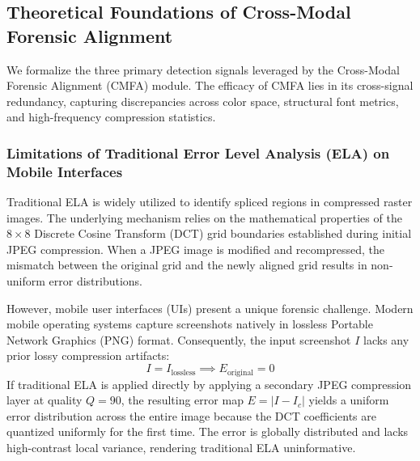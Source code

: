 \subsection{Theoretical Foundations of Cross-Modal Forensic Alignment}
\label{sec:cmfa_theory}

We formalize the three primary detection signals leveraged by the Cross-Modal Forensic Alignment (CMFA) module. The efficacy of CMFA lies in its cross-signal redundancy, capturing discrepancies across color space, structural font metrics, and high-frequency compression statistics.

\subsubsection{Limitations of Traditional Error Level Analysis (ELA) on Mobile Interfaces}
Traditional ELA is widely utilized to identify spliced regions in compressed raster images. The underlying mechanism relies on the mathematical properties of the $8 \times 8$ Discrete Cosine Transform (DCT) grid boundaries established during initial JPEG compression. When a JPEG image is modified and recompressed, the mismatch between the original grid and the newly aligned grid results in non-uniform error distributions.

However, mobile user interfaces (UIs) present a unique forensic challenge. Modern mobile operating systems capture screenshots natively in lossless Portable Network Graphics (PNG) format. Consequently, the input screenshot $I$ lacks any prior lossy compression artifacts:
\begin{equation}
    I = I_{\text{lossless}} \implies E_{\text{original}} = 0
\end{equation}
If traditional ELA is applied directly by applying a secondary JPEG compression layer at quality $Q=90$, the resulting error map $E = |I - I_c|$ yields a uniform error distribution across the entire image because the DCT coefficients are quantized uniformly for the first time. The error is globally distributed and lacks high-contrast local variance, rendering traditional ELA uninformative.

